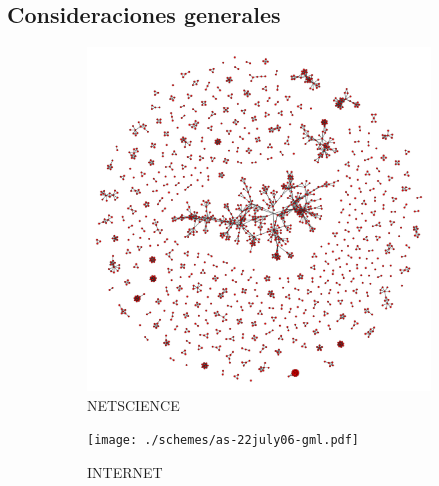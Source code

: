 \subsection{Consideraciones generales}
\begin{figure}[!ht]
    \centering
    \begin{subfigure}[b]{0.30\columnwidth}
        \includegraphics[width=\textwidth]{./schemes/netscience-gml.pdf}
        \caption{\label{fig4:NETSCIENCE}NETSCIENCE}
    \end{subfigure}
    \begin{subfigure}[b]{0.30\columnwidth}
        \texttt{[image: ./schemes/as-22july06-gml.pdf]}
        \caption{\label{fig4:INTERNET}INTERNET}
    \end{subfigure}
    \\
    \begin{subfigure}[b]{0.30\columnwidth}

\end{subfigure}
\end{figure}
